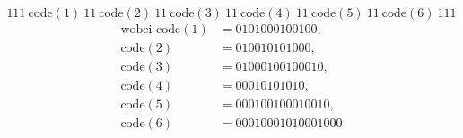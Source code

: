 \[
	111\ \text{code}(1)\ 11\ \text{code}(2)\ 11\ \text{code}(3)\ 11\ 
	\text{code}(4)\ 11\ \text{code}(5)\ 11\ \text{code}(6)\ 111
\]
\begin{align*}
	\text{wobei }
	\text{code}(1) &= 0101000100100,\\
	\text{code}(2) &= 010010101000,\\
	\text{code}(3) &= 01000100100010,\\
	\text{code}(4) &= 00010101010,\\
	\text{code}(5) &= 000100100010010,\\
	\text{code}(6) &= 00010001010001000
\end{align*}

